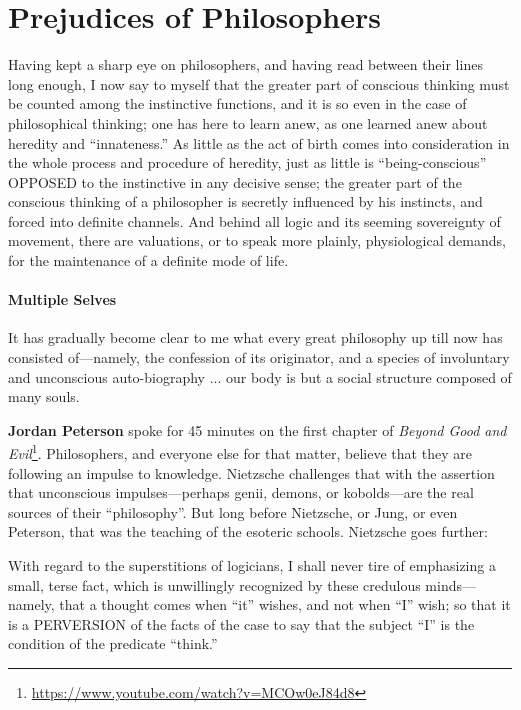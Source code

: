 \section{Prejudices of Philosophers}

\begin{quotex}
Having kept a sharp eye on philosophers, and having read between their lines long enough, I now say to myself that the greater part of conscious thinking must be counted among the instinctive functions, and it is so even in the case of philosophical thinking; one has here to learn anew, as one learned anew about heredity and ``innateness.'' As little as the act of birth comes into consideration in the whole process and procedure of heredity, just as little is ``being-conscious'' OPPOSED to the instinctive in any decisive sense; the greater part of the conscious thinking of a philosopher is secretly influenced by his instincts, and forced into definite channels. And behind all logic and its seeming sovereignty of movement, there are valuations, or to speak more plainly, physiological demands, for the maintenance of a definite mode of life.
\end{quotex}


\paragraph{Multiple Selves}


\begin{quotex}
It has gradually become clear to me what every great philosophy up till now has consisted of---namely, the confession of its originator, and a species of involuntary and unconscious auto-biography ... our body is but a social structure composed of many souls.
\end{quotex}


\textbf{Jordan Peterson} spoke for 45 minutes on the first chapter of \emph{Beyond Good and Evil}\footnote{\url{https://www.youtube.com/watch?v=MCOw0eJ84d8}}. Philosophers, and everyone else for that matter, believe that they are following an impulse to knowledge. Nietzsche challenges that with the assertion that unconscious impulses---perhaps genii, demons, or kobolds---are the real sources of their ``philosophy''. But long before Nietzsche, or Jung, or even Peterson, that was the teaching of the esoteric schools. Nietzsche goes further:

\begin{quotex}
With regard to the superstitions of logicians, I shall never tire of emphasizing a small, terse fact, which is unwillingly recognized by these credulous minds---namely, that a thought comes when ``it'' wishes, and not when ``I'' wish; so that it is a PERVERSION of the facts of the case to say that the subject ``I'' is the condition of the predicate ``think.''
\end{quotex}


